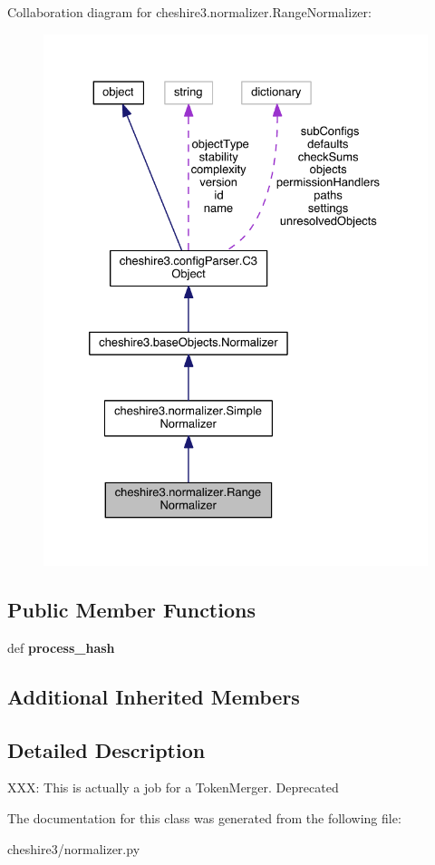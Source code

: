 Collaboration diagram for cheshire3.\-normalizer.\-Range\-Normalizer\-:
\nopagebreak
\begin{figure}[H]
\begin{center}
\leavevmode
\includegraphics[width=328pt]{classcheshire3_1_1normalizer_1_1_range_normalizer__coll__graph}
\end{center}
\end{figure}
\subsection*{Public Member Functions}
\begin{DoxyCompactItemize}
\item 
\hypertarget{classcheshire3_1_1normalizer_1_1_range_normalizer_ad2b0baafb7bc534efc4c0b69abe55445}{def {\bfseries process\-\_\-hash}}\label{classcheshire3_1_1normalizer_1_1_range_normalizer_ad2b0baafb7bc534efc4c0b69abe55445}

\end{DoxyCompactItemize}
\subsection*{Additional Inherited Members}


\subsection{Detailed Description}
\begin{DoxyVerb}XXX: This is actually a job for a TokenMerger. Deprecated\end{DoxyVerb}
 

The documentation for this class was generated from the following file\-:\begin{DoxyCompactItemize}
\item 
cheshire3/normalizer.\-py\end{DoxyCompactItemize}
